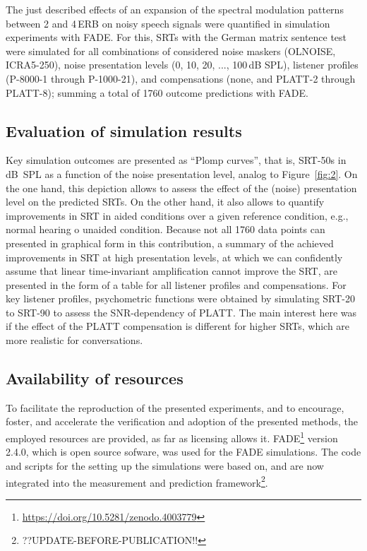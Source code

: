 \documentclass[10pt,a4paper,twocolumn]{article}
\begin{document}
The just described effects of an expansion of the spectral modulation patterns between 2 and 4\,ERB on noisy speech signals were quantified in simulation experiments with FADE.
%
For this, SRTs with the German matrix sentence test were simulated for all combinations of considered noise maskers (OLNOISE, ICRA5-250), noise presentation levels (0, 10, 20, ..., 100\,dB SPL), listener profiles (P-8000-1 through P-1000-21), and compensations (none, and PLATT-2 through PLATT-8); summing a total of 1760 outcome predictions with FADE.

\subsection*{Evaluation of simulation results}
%
Key simulation outcomes are presented as \enquote{Plomp curves}, that is, SRT-50s in dB~SPL as a function of the noise presentation level, analog to Figure~\ref{fig:2}.
%
On the one hand, this depiction allows to assess the effect of the (noise) presentation level on the predicted SRTs.
%
On the other hand, it also allows to quantify improvements in SRT in aided conditions over a given reference condition, e.g., normal hearing o unaided condition.
%
Because not all 1760 data points can presented in graphical form in this contribution, a summary of the achieved improvements in SRT at high presentation levels, at which we can confidently assume that linear time-invariant amplification cannot improve the SRT, are presented in the form of a table for all listener profiles and compensations.
%
For key listener profiles, psychometric functions were obtained by simulating SRT-20 to SRT-90 to assess the SNR-dependency of PLATT.
%
The main interest here was if the effect of the PLATT compensation is different for higher SRTs, which are more realistic for conversations.

\subsection*{Availability of resources}
\label{sec:ressources}
%
To facilitate the reproduction of the presented experiments, and to encourage, foster, and accelerate the verification and adoption of the presented methods, the employed resources are provided, as far as licensing allows it.
%
FADE\footnote{\url{https://doi.org/10.5281/zenodo.4003779}} version 2.4.0, which is open source sofware, was used for the FADE simulations.
%
The code and scripts for the setting up the simulations were based on, and are now integrated into the measurement and prediction framework\footnote{??UPDATE-BEFORE-PUBLICATION!!}.
\end{document}
